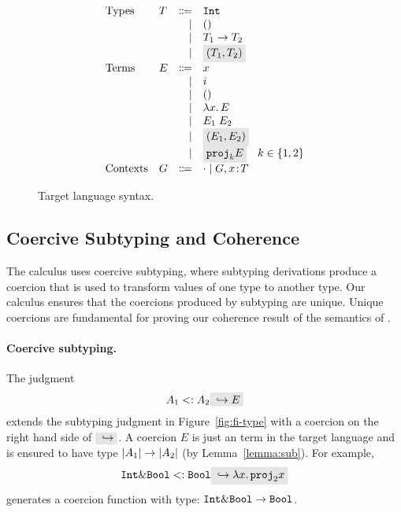 \begin{figure}[t]
  \[
    \begin{array}{llrl}
      \text{Types}    & T & \Coloneqq & \code{Int} \\
                      &   & \mid      & \unit \\
                      &   & \mid      & {T_1} \to {T_2} \\
                      &   & \mid      & \highlight {$ \pair {T_1} {T_2} $} \\
      \text{Terms}    & E & \Coloneqq & x \\
                      &   & \mid      & i \\
                      &   & \mid      & \unit \\
                      &   & \mid      & \lamty x T E \\
                      &   & \mid      & \app {E_1} {E_2} \\
                      &   & \mid      & \highlight {$ \pair {E_1} {E_2} $} \\
                      &   & \mid      & \highlight {$ \proj k E $} \quad k \in \{ 1, 2 \} \\
      \text{Contexts} & G & \Coloneqq & \cdot \mid G, x \oftype T \\
    \end{array}
  \]
  \caption{Target language syntax.}
  \label{fig:f-syntax}
\end{figure}


\subsection{Coercive Subtyping and Coherence} 
The \name calculus uses coercive subtyping, where subtyping
derivations produce a coercion that is used to transform values of one
type to another type. Our calculus ensures that the coercions produced
by subtyping are unique. Unique coercions are fundamental for proving 
our coherence result of the semantics of \name.

\paragraph{Coercive subtyping.}

The judgment
\[
A_1 \subtype A_2 \yields E
\]
extends the subtyping judgment in Figure~\ref{fig:fi-type} with a coercion
on the right hand side of $ \yields {} $. A coercion $ E $ is just an term
in the target language and is ensured to have type
$ \lvert A_1 \rvert \to \lvert A_2 \rvert $ (by Lemma~\ref{lemma:sub}). For example,
\[
\code{Int} \inter \code{Bool} \subtype \code{Bool} \yields {\lamty x {\im {\code{Int} \inter \code{Bool}}} {\proj 2 x}}
\]
generates a coercion function with type: $\texttt{Int} \& \texttt{Bool} \to \texttt{Bool}$.

